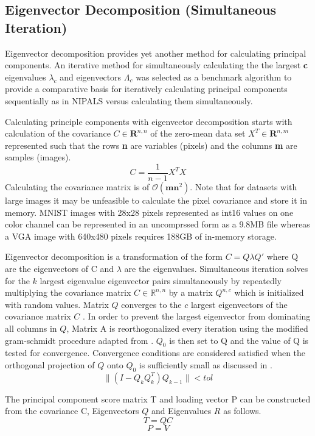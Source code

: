 \documentclass[12pt]{article}
\begin{document}
\subsection{Eigenvector Decomposition (Simultaneous Iteration)}\label{3.3}
Eigenvector decomposition provides yet another method for calculating principal components. An iterative method for simultaneously calculating the the largest \textbf{c} eigenvalues $\lambda_c$ and eigenvectors $\Lambda_c$ was selected as a benchmark algorithm to provide a comparative basis for iteratively calculating principal components sequentially as in NIPALS versus calculating them simultaneously.

Calculating principle components with eigenvector decomposition starts with calculation of the covariance $C \in \mathbf{R}^{n,n}$ of the zero-mean data set $X^T \in \mathbf{R}^{n,m}$ represented such that the rows \textbf{n} are variables (pixels) and the columns \textbf{m} are samples (images).
$$C=\frac{1}{n-1}X^TX$$
Calculating the covariance matrix is of $\mathcal{O}(\textbf{mn}^2)$. Note that for datasets with large images it may be unfeasible to calculate the pixel covariance and store it in memory. MNIST images with 28x28 pixels represented as int16 values on one color channel can be represented in an uncomprssed form as a 9.8MB file whereas a VGA image with 640x480 pixels requires 188GB of in-memory storage.

Eigenvector decomposition is a transformation of the form $C=Q \lambda Q'$ where Q are the eigenvectors of C and $\lambda$ are the eigenvalues. Simultaneous iteration solves for the $k$ largest eigenvalue eigenvector pairs simultaneously by repeatedly multiplying the covariance matrix $C \in \mathbb{R}^{n,n}$ by a matrix $Q^{n,c}$ which is initialized with random values. Matrix $Q$ converges to the $c$ largest eigenvectors of the covariance matrix $C$ \cite{trefethen1997numerical}. In order to prevent the largest eigenvector from dominating all columns in $Q$, Matrix A is reorthogonalized every iteration using the modified gram-schmidt procedure adapted from \cite{srinivasan}. $Q_0$ is then set to Q and the value of Q is tested for convergence. Convergence conditions are considered satisfied when the orthogonal projection of $Q$ onto $Q_0$ is sufficiently small as discussed in \cite{arbenz2012lecture}.
$$ \|(I-Q_kQ_k^T)Q_{k-1}\|<tol$$

The principal component score matrix T and loading vector P can be constructed from the covariance C,  Eigenvectors $Q$ and Eigenvalues $R$ as follows.
$$T=QC$$
$$P=V$$
\end{document}
